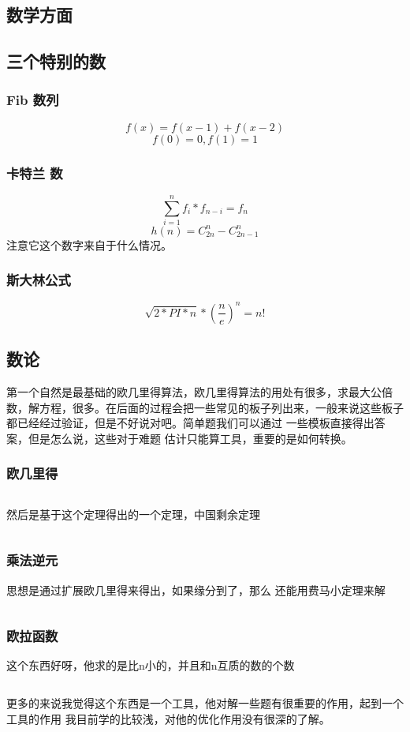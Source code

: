 \documentclass[a4paper,11pt]{article}
\begin{document}
\begin{CJK}{UTF8}{gbsn}
\section{数学方面}
\subsection{三个特别的数}
\subsubsection{Fib 数列}
$$f(x) = f(x-1)+f(x-2)$$
$$f(0) = 0,f(1) = 1$$
\subsubsection{卡特兰 数}
$$\sum_{i=1}^n f_i*f_{n-i}=f_n$$
$$h(n) = C_{2n}^n - C_{2n-1}^{n}$$
注意它这个数字来自于什么情况。
\subsubsection{斯大林公式}
$$ \sqrt{2*PI*n} * (\frac{n}{e})^n = n!$$
\subsection{数论}
第一个自然是最基础的欧几里得算法，欧几里得算法的用处有很多，求最大公倍数，解方程，很多。在后面的过程会把一些常见的板子列出来，一般来说这些板子
都已经经过验证，但是不好说对吧。简单题我们可以通过
一些模板直接得出答案，但是怎么说，这些对于难题
估计只能算工具，重要的是如何转换。
\subsubsection{欧几里得}
\inputminted{c++}{../scoure/math/GCD.cpp}
然后是基于这个定理得出的一个定理，中国剩余定理
\inputminted{c++}{../scoure/math/chineseshengyu.cpp}
\subsubsection{乘法逆元}
思想是通过扩展欧几里得来得出，如果缘分到了，那么
还能用费马小定理来解
\inputminted{c++}{../scoure/math/niyuan.cpp}
\subsubsection{欧拉函数}
这个东西好呀，他求的是比n小的，并且和n互质的数的个数
\inputminted{c++}{../scoure/math/oula.cpp}
更多的来说我觉得这个东西是一个工具，他对解一些题有很重要的作用，起到一个工具的作用
我目前学的比较浅，对他的优化作用没有很深的了解。

\end{CJK}
\end{document}
